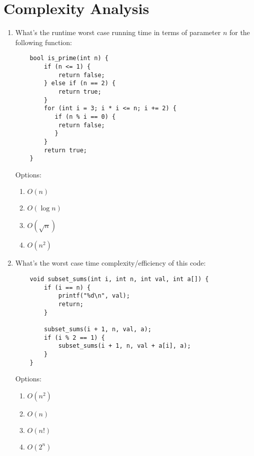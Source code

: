 \documentclass{article}
\begin{document}
\newpage
\section*{Complexity Analysis}

\begin{enumerate}
    
    \item What’s the runtime worst case running time in terms of parameter \( n \) for the following function:
    \begin{lstlisting}
    bool is_prime(int n) {
        if (n <= 1) {
            return false;
        } else if (n == 2) {
            return true;
        }
        for (int i = 3; i * i <= n; i += 2) {
           if (n % i == 0) {
            return false;
           }
        }
        return true;
    }
    \end{lstlisting}
    Options:
    \begin{enumerate}[label=\alph*.]
        \item \( O(n) \)
        \item \( O(\log n) \)
        \item \( O(\sqrt{n}) \)
        \item \( O(n^2) \)
    \end{enumerate}

    \item What’s the worst case time complexity/efficiency of this code:
    \begin{lstlisting}
    void subset_sums(int i, int n, int val, int a[]) {
        if (i == n) {
            printf("%d\n", val);
            return;
        }
        
        subset_sums(i + 1, n, val, a);
        if (i % 2 == 1) {
            subset_sums(i + 1, n, val + a[i], a);
        }
    }
    \end{lstlisting}
    Options:
    \begin{enumerate}[label=\alph*.]
        \item \( O(n^2) \)
        \item \( O(n) \)
        \item \( O(n!) \)
        \item \( O(2^n) \)
    \end{enumerate}

    \newpage


\end{enumerate}
\end{document}
